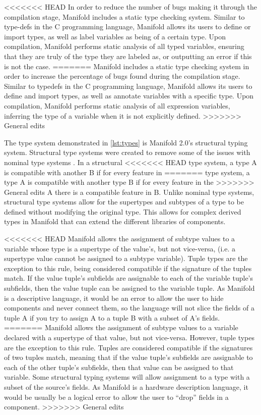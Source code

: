<<<<<<< HEAD
In order to reduce the number of bugs making it through the compilation stage,
Manifold includes a static type checking system. Similar to type-defs in the C
programming language, Manifold allows its users to define or import types,
as well as label variables as being of a certain type. Upon compilation,
Manifold performs static analysis of all typed variables, ensuring that they are
truly of the type they are labeled as, or outputting an error if this is not the
case.
=======
Manifold includes a static type checking system in order to increase the percentage of bugs found during
the compilation stage. Similar to typedefs in the C
programming language, Manifold allows its users to define and import types,
as well as annotate variables with a specific type. Upon compilation,
Manifold performs static analysis of all expression variables, inferring the type of a variable when it
is not explicitly defined.
>>>>>>> General edits

The type system demonstrated in \autoref{lst:types} is Manifold 2.0's structural typing system.
Structural type systems were
created to remove some of the issues with nominal type systems
\cite{Gil:2008:WIS:1449764.1449771}. In a structural
<<<<<<< HEAD
type system, a type A is compatible with another B if for every feature in
=======
type system, a type A is compatible with another type B if for every feature in the
>>>>>>> General edits
A there is a compatible feature in B. Unlike nominal type systems, structural
type systems allow for the supertypes and subtypes of a type to be defined without
modifying the original type. This allows for complex derived types in Manifold that
can extend the different libraries of components.

<<<<<<< HEAD
Manifold allows the assignment of subtype values to a variable whose type is a
supertype of the value's, but not vice-versa, (i.e. a supertype value cannot be
assigned to a subtype variable).
Tuple types are the exception to this rule, being
considered compatible if the signature of the tuples
match. If the value tuple's subfields are assignable to each of the
variable tuple's subfields, then the value tuple can be assigned to the variable
tuple. As Manifold is a descriptive language, it would be an error to allow
the user to hide components and never connect them, so the language will not slice
the fields of a tuple A if you try to assign A to a tuple B with a subset of A's
fields.
=======
Manifold allows the assignment of subtype values to a variable declared with a supertype of that value,
but not vice-versa.
However, tuple types are the exception to this rule. Tuples are
considered compatible if the signatures of two tuples
match, meaning that if the value tuple's subfields are assignable to each of the
other tuple's subfields, then that value can be assigned to that variable.
Some structural typing systems will allow assignment to a type with a subset of the source's fields.
As Manifold is a hardware description language, it would be usually be a logical error to allow
the user to ``drop'' fields in a component.
>>>>>>> General edits

